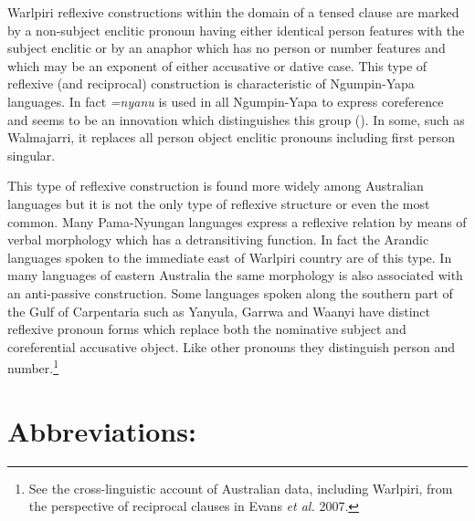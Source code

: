 \documentclass[output=paper]{../langscibook}
\begin{document}
Warlpiri reflexive constructions within the domain of a tensed clause are marked by a non-subject enclitic pronoun having either identical person features with the subject enclitic or by an anaphor which has no person or number features and which may be an exponent of either accusative or dative case. This type of reflexive (and reciprocal) construction is characteristic of Ngumpin-Yapa languages. In fact \textit{=nyanu} is used in all Ngumpin-Yapa to express coreference and seems to be an innovation which distinguishes this group (\citealt{McConvellLaughren2004}). In some, such as Walmajarri, it replaces all person object enclitic pronouns including first person singular.

This type of reflexive construction is found more widely among Australian languages but it is not the only type of reflexive structure or even the most common. Many Pama-Nyungan languages express a reflexive relation by means of verbal morphology which has a detransitiving function. In fact the Arandic languages spoken to the immediate east of Warlpiri country are of this type. In many languages of eastern Australia the same morphology is also associated with an anti-passive construction. Some languages spoken along the southern part of the Gulf of Carpentaria such as Yanyula, Garrwa and Waanyi have distinct reflexive pronoun forms which replace both the nominative subject and coreferential accusative object. Like other pronouns they distinguish person and number.\footnote{\textrm{See the cross-linguistic account of Australian data, including Warlpiri, from the perspective of reciprocal clauses in Evans} \textrm{\textit{et al.}} \textrm{2007.} }

\section{Abbreviations:}
\end{document}
